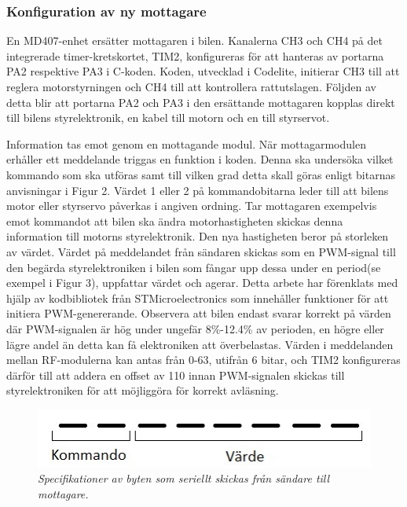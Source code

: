 \documentclass[a4paper]{article}
\begin{document}
\subsubsection{Konfiguration av ny mottagare}
En MD407-enhet ersätter mottagaren i bilen. Kanalerna CH3 och CH4 på det integrerade timer-kretskortet, TIM2, konfigureras för att hanteras av portarna PA2 respektive PA3 i C-koden. Koden, utvecklad i Codelite, initierar CH3 till att reglera motorstyrningen och CH4 till att kontrollera rattutslagen. Följden av detta blir att portarna PA2 och PA3 i den ersättande mottagaren kopplas direkt till bilens styrelektronik, en kabel till motorn och en till styrservot. 

\vspace{5mm} \noindent
Information tas emot genom en mottagande modul. När mottagarmodulen erhåller ett meddelande triggas en funktion i koden. Denna ska undersöka vilket kommando som ska utföras samt till vilken grad detta skall göras enligt bitarnas anvisningar i Figur 2. Värdet 1 eller 2 på kommandobitarna leder till att bilens motor eller styrservo påverkas i angiven ordning. Tar mottagaren exempelvis emot kommandot att bilen ska ändra motorhastigheten skickas denna information till motorns styrelektronik. Den nya hastigheten beror på storleken av värdet. Värdet på meddelandet från sändaren skickas som en PWM-signal till den begärda styrelektroniken i bilen som fångar upp dessa under en period(se exempel i Figur 3), uppfattar värdet och agerar. Detta arbete har förenklats med hjälp av kodbibliotek från STMicroelectronics som innehåller funktioner för att initiera PWM-genererande. Observera att bilen endast svarar korrekt på värden där PWM-signalen är hög under ungefär 8\%-12.4\% av perioden, en högre eller lägre andel än detta kan få elektroniken att överbelastas. Värden i meddelanden mellan RF-modulerna kan antas från 0-63, utifrån 6 bitar, och TIM2 konfigureras därför till att addera en offset av 110 innan PWM-signalen skickas till styrelektroniken för att möjliggöra för korrekt avläsning.

\begin{figure}[H]
\includegraphics[scale=1]{aByteComVal.jpg}
\centering
\caption{\it Specifikationer av byten som seriellt skickas från sändare till mottagare.}
\end{figure} 
\end{document}
